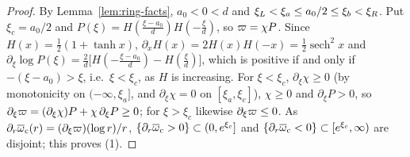 \begin{proof}
By Lemma~\ref{lem:ring-facts}, $a_0<0<d$ and $\xi_L<\xi_a\le a_0/2\le\xi_b<\xi_R$.
Put $\xi_c=a_0/2$ and $P(\xi)=H(\frac{\xi-a_0}d)H(-\frac\xi d)$, so $\varpi=\chi P$.
Since $H(x)=\frac12(1+\tanh x)$, $\partial_xH(x)=2H(x)H(-x)=\frac12\operatorname{sech}^2x$ and
$\partial_\xi\log P(\xi)=\frac2d\big[H(-\frac{\xi-a_0}d)-H(\frac\xi d)\big]$, which is
positive if and only if $-(\xi-a_0)>\xi$, i.e.\ $\xi<\xi_c$, as $H$ is increasing.
For $\xi<\xi_c$, $\partial_\xi\chi\ge0$ (by monotonicity on $(-\infty,\xi_a]$, and $\partial_\xi\chi=0$
on $[\xi_a,\xi_c]$), $\chi\ge0$ and $\partial_\xi P>0$, so $\partial_\xi\varpi=(\partial_\xi\chi)P+\chi\,\partial_\xi P\ge0$; for
$\xi>\xi_c$ likewise $\partial_\xi\varpi\le0$. As $\partial_r\overline{\omega}_{\mathrm{c}}(r)=(\partial_\xi\varpi)(\log r)/r$,
$\{\partial_r\overline{\omega}_{\mathrm{c}}>0\}\subset(0,e^{\xi_c}]$ and $\{\partial_r\overline{\omega}_{\mathrm{c}}<0\}\subset[e^{\xi_c},\infty)$ are
disjoint; this proves (1).


\end{proof}

